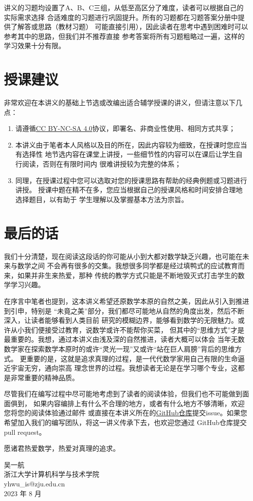 讲义的习题均设置了A、B、C三组，从低至高区分了难度，读者可以根据自己的实际需求选择
合适难度的习题进行巩固提升。所有的习题都在习题答案分册中提供了解答或思路（教材习题）
可能直接引用），因此读者在思考中遇到困难时可以参考其中的思路，但我们并不推荐直接
参考答案将所有习题粗略过一遍，这样的学习效果十分有限。

\section*{授课建议}
非常欢迎在本讲义的基础上节选或改编出适合辅学授课的讲义，但请注意以下几点：
\begin{enumerate}
    \item 请遵循\href{https://creativecommons.org/licenses/by-nc-sa/4.0/deed.zh}
    {CC BY-NC-SA 4.0}协议，即署名、非商业性使用、相同方式共享；
    \item 本讲义由于笔者本人风格以及目的所在，因此内容较为细致，在授课时您应当有选择性
    地节选内容在课堂上讲授，一些细节性的内容可以在课后让学生自行阅读，否则在有限时间内
    很难讲授较为完整的体系；
    \item 同理，在授课过程中您可以选取对您的授课思路有帮助的经典例题或习题进行讲授。
    授课中题在精不在多，您应当根据自己的授课风格和时间安排合理地选择题目，以有助于
    学生理解以及掌握基本方法为宗旨。
\end{enumerate}

\section*{最后的话}
我们十分清楚，现在阅读这段话的你可能从小到大都对数学缺乏兴趣，也可能在未来与数学之间
不会再有很多的交集。我想很多同学都是经过填鸭式的应试教育而来，如果并非生来热爱，那种
传统的教学方式只能是不断地毁灭式打击学生的数学学习兴趣。

在序言中笔者也提到，这本讲义希望还原数学本原的自然之美，因此从引入到推进到引申，特别是
``未竟之美''部分，我们都尽可能地从自然的角度出发，然后不断深入，让读者能够看到人类目前
研究的模糊边界，能够看到数学的无限魅力。或许从小我们便接受过教育，说数学或许不能帮你买菜，
但其中的``思维方式''才是最重要的。我想，通过本讲义由浅及深的自然推进，读者大概可以体会
当年无数数学家在探索数学本原时的或许``灵光一现''又或许``站在巨人肩膀''背后的思维方式。
更重要的是，这就是追求真理的过程，是一代代数学家用自己有限的生命逼近宇宙无穷，通向崇高
理念世界的过程。我想读者无论是在学习哪个专业，这都是非常重要的精神品质。

尽管我们在编写过程中尽可能地考虑到了读者的阅读体验，但我们也不可能做到面面俱到，
如果内容编排上有什么不合理的地方，或者有什么地方不够清晰，欢迎您将您的阅读体验通过邮件
或直接在本讲义所在的\href{https://github.com/yhwu-is/Linear-Algebra-Left-Undone}
{GitHub仓库}提交issue。如果您希望加入我们的编写团队，将这一讲义传承下去，也欢迎您通过
GitHub仓库提交pull request。

愿诸君热爱数学，热爱对真理的追求。

\begin{flushright}
    \kaishu
    吴一航 \\
    浙江大学计算机科学与技术学院 \\
    yhwu\_is@zju.edu.cn \\
    2023 年 8 月
\end{flushright}